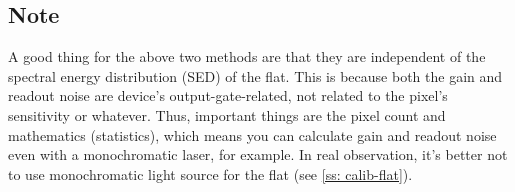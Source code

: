 \subsection{Note}
A good thing for the above two methods are that they are independent of the spectral energy distribution (SED) of the flat. This is because both the gain and readout noise are device's output-gate-related, not related to the pixel's sensitivity or whatever. Thus, important things are the pixel count and mathematics (statistics), which means you can calculate gain and readout noise even with a monochromatic laser, for example. In real observation, it's better not to use monochromatic light source for the flat (see \cref{ss: calib-flat}).




